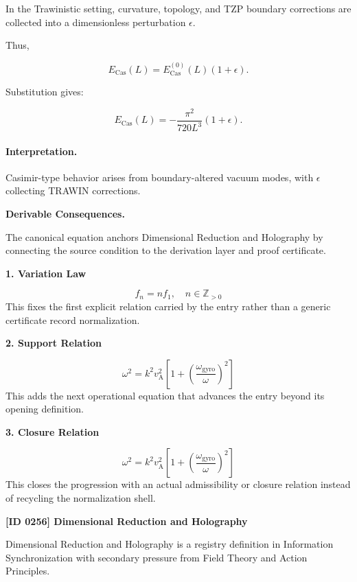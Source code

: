 In the Trawinistic setting, curvature, topology, and TZP boundary corrections are collected into a dimensionless perturbation $\epsilon$.

Thus,

\begin{equation}
E_{\mathrm{Cas}}(L)
=
E_{\mathrm{Cas}}^{(0)}(L)(1+\epsilon).
\end{equation}

Substitution gives:

\begin{equation}
\boxed{
E_{\mathrm{Cas}}(L)
=
-\frac{\pi^2}{720L^3}(1+\epsilon).
}
\end{equation}

\paragraph{Interpretation.}
Casimir-type behavior arises from boundary-altered vacuum modes, with $\epsilon$ collecting TRAWIN corrections.

\par\vspace{0.35em}
\noindent\textbf{Derivable Consequences.}\quad
\begingroup
\footnotesize
\raggedright
The canonical equation anchors Dimensional Reduction and Holography by connecting the source condition to the derivation layer and proof certificate.
\par\endgroup

\noindent\textbf{1. Variation Law}\par
\[
f_{n}=n f_{1},\quad n\in\mathbb{Z}_{>0}
\]
\noindent This fixes the first explicit relation carried by the entry rather than a generic certificate record normalization.\par
\noindent\textbf{2. Support Relation}\par
\[
\omega^{2} = k^{2} v_{\mathrm{A}}^{2}\left[1 + \left(\frac{\omega_{\mathrm{gyro}}}{\omega}\right)^{2}\right]
\]
\noindent This adds the next operational equation that advances the entry beyond its opening definition.\par
\noindent\textbf{3. Closure Relation}\par
\[
\omega^{2} = k^{2} v_{\mathrm{A}}^{2}\left[1 + \left(\frac{\omega_{\mathrm{gyro}}}{\omega}\right)^{2}\right]
\]
\noindent This closes the progression with an actual admissibility or closure relation instead of recycling the normalization shell.\par

\clearpage
\noindent\textbf{[ID 0256] Dimensional Reduction and Holography}\par
\vspace{0.35em}
\begingroup\small
{}
Dimensional Reduction and Holography is a registry definition in Information Synchronization with secondary pressure from Field Theory and Action Principles.

